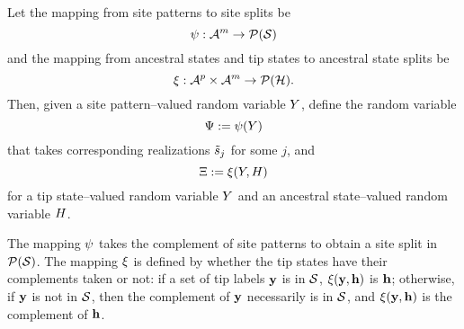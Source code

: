 \begin{definition}
Let the mapping from site patterns to site splits be
$$
\psi:\mathcal{A}^m\rightarrow\mathcal{P}(\mathcal{S})
$$
and the mapping from ancestral states and tip states to ancestral state splits be
$$
\xi:\mathcal{A}^p\times\mathcal{A}^m\rightarrow\mathcal{P}(\mathcal{H}).
$$
Then, given a site pattern--valued random variable $Y$, define the random variable
$$
\Psi := \psi(Y)
$$
that takes corresponding realizations $\tilde{s}_j$ for some $j$, and
$$
\Xi := \xi(Y, H)
$$
for a tip state--valued random variable $Y$ and an ancestral state--valued random variable $H$.
\end{definition}
The mapping $\psi$ takes the complement of site patterns to obtain a site split in $\mathcal{P}(\mathcal{S})$.
The mapping $\xi$ is defined by whether the tip states have their complements taken or not: if a set of tip labels $\mathbf{y}$ is in $\mathcal{S}$, $\xi(\mathbf{y}, \mathbf{h})$ is $\mathbf{h}$; otherwise, if $\mathbf{y}$ is not in $\mathcal{S}$, then the complement of $\mathbf{y}$ necessarily is in $\mathcal{S}$, and $\xi(\mathbf{y}, \mathbf{h})$ is the complement of $\mathbf{h}$.

